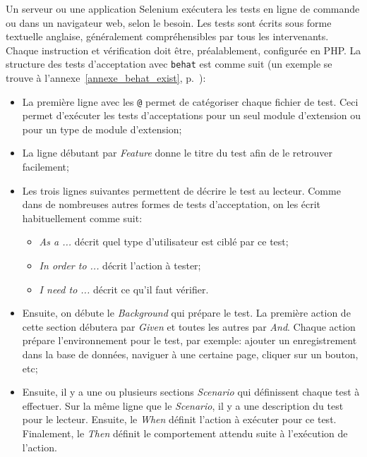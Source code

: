 Un serveur ou une application Selenium ex\'ecutera les tests en ligne de commande ou dans un navigateur web, selon le besoin.
Les tests sont \'ecrits sous forme textuelle anglaise, g\'en\'eralement compr\'ehensibles par tous les intervenants.
Chaque instruction et v\'erification doit \^etre, pr\'ealablement, configur\'ee en PHP.
La structure des tests d'acceptation avec \texttt{behat} est comme suit (un exemple se trouve à l'annexe~\ref{annexe_behat_exist}, p.~\pageref{annexe_behat_exist}):
\begin{itemize}
  \item La premi\`ere ligne avec les \verb|@| permet de cat\'egoriser chaque fichier de test.
        Ceci permet d'ex\'ecuter les tests d'acceptations pour un seul module d'extension ou pour un type de module d'extension;
        
  \item La ligne d\'ebutant par \textit{Feature} donne le titre du test afin de le retrouver facilement;
  
  \item Les trois lignes suivantes permettent de d\'ecrire le test au lecteur.
        Comme dans de nombreuses autres formes de tests d'acceptation, on les \'ecrit habituellement comme suit:
        
        \begin{itemize}
          \item \og \textit{As a ...} \fg{} d\'ecrit quel type d'utilisateur est cibl\'e par ce test;
          \item \og \textit{In order to ...} \fg{} d\'ecrit l'action \`a tester;
          \item \og \textit{I need to ...} \fg{} d\'ecrit ce qu'il faut v\'erifier.
        \end{itemize}
        
  \item Ensuite, on d\'ebute le \textit{Background} qui pr\'epare le test.
        La premi\`ere action de cette section d\'ebutera par \textit{Given} et toutes les autres par \textit{And}.
        Chaque action pr\'epare l'environnement pour le test, par exemple: ajouter un enregistrement dans la base de donn\'ees, naviguer \`a une certaine page, cliquer sur un bouton, etc;
        
  \item Ensuite, il y a une ou plusieurs sections \textit{Scenario} qui d\'efinissent chaque test \`a effectuer.
        Sur la m\^eme ligne que le \textit{Scenario}, il y a une description du test pour le lecteur.
        Ensuite, le \textit{When} d\'efinit l'action \`a ex\'ecuter pour ce test.
        Finalement, le \textit{Then} d\'efinit le comportement attendu suite \`a l'ex\'ecution de l'action.
\end{itemize}

